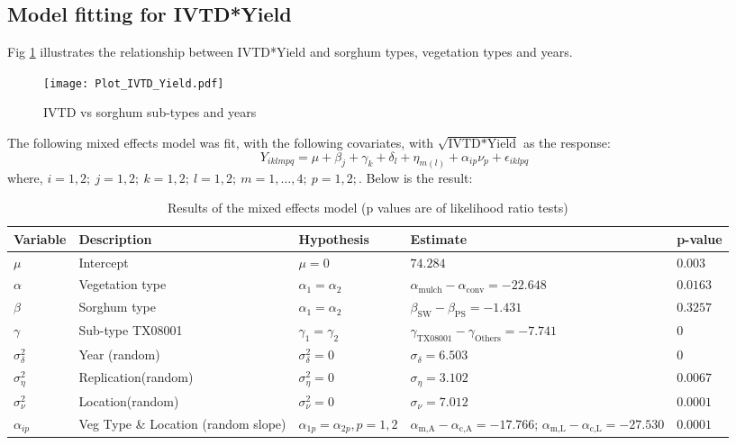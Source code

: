 \subsection*{Model fitting for IVTD*Yield}
Fig \ref{fig:Fig8} illustrates the relationship between IVTD*Yield and sorghum types, vegetation types and years.
\vspace{-1cm}
\begin{figure}[H]
\centering
\texttt{[image: Plot\_IVTD\_Yield.pdf]}
\caption{IVTD vs sorghum sub-types and years}
\label{fig:Fig8}
\end{figure}

The following mixed effects model was fit, with the following covariates, with $\sqrt{\text{IVTD*Yield}}$ as the response:
\[ Y_{iklmpq} = \mu + \beta_j + \gamma_k + \delta_l + \eta_{m(l)} + \alpha_{ip}\nu_p +  \epsilon_{iklpq} \]
where, $i = 1,2; \ j = 1,2; \ k = 1, 2; \ l = 1,2; \ m = 1,\dots,4; \ p = 1, 2; $. Below is the result:

\begin{table}[H] \centering 
\small
\begin{tabular}{ l | p{3.5cm} | l | p{4.5cm} | l }
\hline 
\hline
Variable & Description & Hypothesis & Estimate & p-value \\
\hline
$\mu$ 		& Intercept 		& $\mu = 0$ 			& $74.284$ 							& $0.003$ \\
$\alpha$	& Vegetation type 	& $\alpha_1 = \alpha_2 $ 	& $\alpha_{\text{mulch}} - \alpha_{\text{conv}} = -22.648$ 	& $0.0163$ \\
$\beta$		& Sorghum type 		& $\alpha_1 = \alpha_2 $ 	& $\beta_{\text{SW}} - \beta_{\text{PS}}= -1.431$	 	& $0.3257$ \\
$\gamma$	& Sub-type TX08001	& $\gamma_1 = \gamma_2$		& $\gamma_{\text{TX08001}} - \gamma_{\text{Others}}= -7.741$	& $0$ \\
$\sigma_{\delta}^2$ & Year (random)	& $\sigma_{\delta}^2 = 0$	& $\sigma_{\delta} = 6.503$					& $0$ \\
$\sigma_{\eta}^2$ & Replication(random)	& $\sigma_{\eta}^2 = 0$		& $\sigma_{\eta} = 3.102$					& $0.0067$ \\
$\sigma_{\nu}^2$ & Location(random)	& $\sigma_{\nu}^2 = 0$		& $\sigma_{\nu} = 7.012$					& $0.0001$ \\
$\alpha_{ip}$ 	& Veg Type \& Location (random slope)	& $\alpha_{1p} = \alpha_{2p}, p = 1,2$		& $\alpha_{\text{m,A}} - \alpha_{\text{c,A}} = -17.766$; $\alpha_{\text{m,L}} - \alpha_{\text{c,L}} = -27.530$ & $0.0001$ \\

\hline
\end{tabular} 
\caption{Results of the mixed effects model (p values are of likelihood ratio tests)} 
\label{Tab:Tab7} 
\end{table} 

